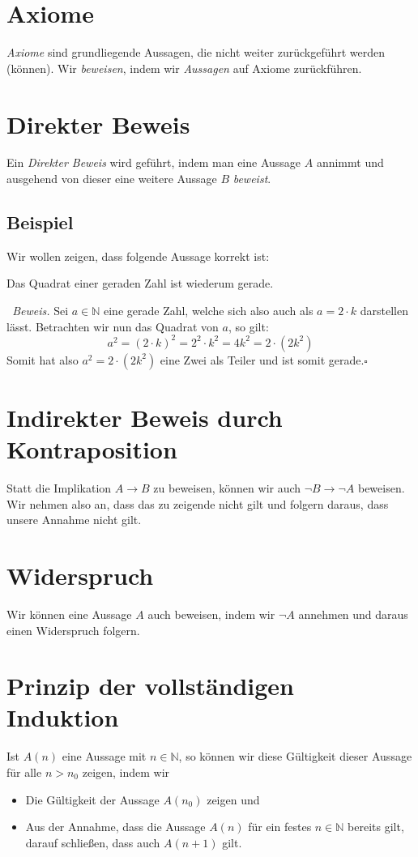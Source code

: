 \documentclass{scrreprt}
\newenvironment{proof}{\emph{\ Beweis.}}{}
\newcommand{\NN}{\mathbb{N}}
\begin{document}
	\section{Axiome}
	\emph{Axiome} sind grundliegende Aussagen, die nicht weiter zurückgeführt werden (können). Wir \emph{beweisen}, indem wir \emph{Aussagen} auf Axiome zurückführen.

	\section{Direkter Beweis}
	Ein \emph{Direkter Beweis} wird geführt, indem man eine Aussage $A$ annimmt und ausgehend von dieser eine weitere Aussage $B$ \emph{beweist}.

	\subsection{Beispiel}
	Wir wollen zeigen, dass folgende Aussage korrekt ist:
	\begin{center}
		Das Quadrat einer geraden Zahl ist wiederum gerade.
	\end{center}
	\begin{proof}
		Sei $a \in \NN$ eine gerade Zahl, welche sich also auch als $a = 2 \cdot k$ darstellen lässt. Betrachten wir nun das Quadrat von $a$, so gilt:
		\begin{equation*}
			a^2 = (2 \cdot k)^2 = 2^2 \cdot k^2 = 4 k^2 = 2 \cdot (2 k^2)
		\end{equation*}
		Somit hat also $a^2 = 2 \cdot (2 k^2)$ eine Zwei als Teiler und ist somit gerade.$\square$
	\end{proof}

	\section{Indirekter Beweis durch Kontraposition}
	Statt die Implikation $A \rightarrow B$ zu beweisen, können wir auch $\neg B \rightarrow \neg A$ beweisen. Wir nehmen also an, dass das zu zeigende nicht gilt und folgern daraus, dass unsere Annahme nicht gilt.

	\section{Widerspruch}
	Wir können eine Aussage $A$ auch beweisen, indem wir $\neg A$ annehmen und daraus einen Widerspruch folgern.

	\section{Prinzip der vollständigen Induktion}
	Ist $A(n)$ eine Aussage mit $n \in \NN$, so können wir diese Gültigkeit dieser Aussage für alle $n > n_0$ zeigen, indem wir
	\begin{itemize}
		\item
			Die Gültigkeit der Aussage $A(n_0)$ zeigen und
		\item
			Aus der Annahme, dass die Aussage $A(n)$ für ein festes $n \in \NN$ bereits gilt, darauf schließen, dass auch $A(n + 1)$ gilt.
	\end{itemize}
\end{document}
